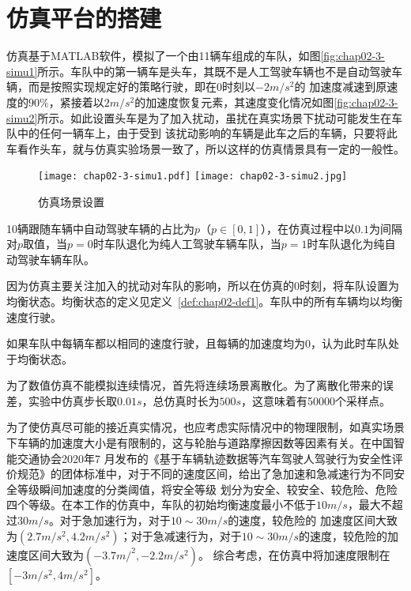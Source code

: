 \section{仿真平台的搭建}
\label{sec:simulation-platform}

仿真基于MATLAB软件，模拟了一个由11辆车组成的车队，如图\ref{fig:chap02-3-simu1}所示。车队中的第一辆车是头车，其既不是人工驾驶车辆也不是自动驾驶车辆，而是按照实现规定好的策略行驶，即在0时刻以$-2m/s^2$的
加速度减速到原速度的$90\%$，紧接着以$2m/s^2$的加速度恢复元素，其速度变化情况如图\ref{fig:chap02-3-simu2}所示。如此设置头车是为了加入扰动，虽扰在真实场景下扰动可能发生在车队中的任何一辆车上，由于受到
该扰动影响的车辆是此车之后的车辆，只要将此车看作头车，就与仿真实验场景一致了，所以这样的仿真情景具有一定的一般性。

\begin{figure}
  \centering
    {\texttt{[image: chap02-3-simu1.pdf]}}
    {\texttt{[image: chap02-3-simu2.jpg]}}
  \caption{仿真场景设置}
  \label{fig:chap02-2-simu}
\end{figure}

10辆跟随车辆中自动驾驶车辆的占比为$p$（$p \in [0, 1]$），在仿真过程中以$0.1$为间隔对$p$取值，当$p=0$时车队退化为纯人工驾驶车辆车队，当$p=1$时车队退化为纯自动驾驶车辆车队。

因为仿真主要关注加入的扰动对车队的影响，所以在仿真的0时刻，将车队设置为均衡状态。均衡状态的定义见定义~\ref{def:chap02-def1}。车队中的所有车辆均以均衡速度行驶。

\begin{definition}[车队的均衡状态]
  如果车队中每辆车都以相同的速度行驶，且每辆的加速度均为0，认为此时车队处于均衡状态。
  \label{def:chap02-def1}
\end{definition}

为了数值仿真不能模拟连续情况，首先将连续场景离散化。为了离散化带来的误差，实验中仿真步长取$0.01s$，总仿真时长为$500s$，这意味着有50000个采样点。

为了使仿真尽可能的接近真实情况，也应考虑实际情况中的物理限制，如真实场景下车辆的加速度大小是有限制的，这与轮胎与道路摩擦因数等因素有关。在中国智能交通协会2020年7
月发布的《基于车辆轨迹数据等汽车驾驶人驾驶行为安全性评价规范》的团体标准中，对于不同的速度区间，给出了急加速和急减速行为不同安全等级瞬间加速度的分类阈值，将安全等级
划分为安全、较安全、较危险、危险四个等级。在本工作的仿真中，车队的初始均衡速度最小不低于$10m/s$，最大不超过$30m/s$。对于急加速行为，对于$10\sim 30m/s$的速度，较危险的
加速度区间大致为$(2.7m/s^2, 4.2m/s^2)$；对于急减速行为，对于$10\sim 30m/s$的速度，较危险的加速度区间大致为$(-3.7m/^2, -2.2m/s^2)$\cite{2020safety}。
综合考虑，在仿真中将加速度限制在$[-3m/s^2, 4m/s^2]$。

